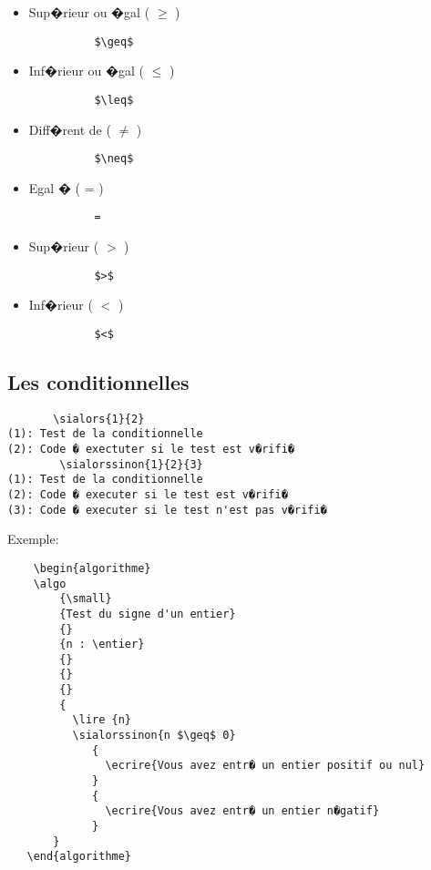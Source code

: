 \documentclass[a4paper,12pt]{report}
\begin{document}
\begin{itemize}
   \item Sup�rieur ou �gal ( $\geq$ )
       \begin{lstlisting}
          $\geq$
       \end{lstlisting}

   \item Inf�rieur ou �gal ( $\leq$ )

        \begin{lstlisting}
          $\leq$
        \end{lstlisting}

   \item Diff�rent de ( $\neq$ )

        \begin{lstlisting}
          $\neq$
        \end{lstlisting}

   \item Egal � ( = )
        \begin{lstlisting}
          =
        \end{lstlisting}
   \item Sup�rieur ( $>$ )
        \begin{lstlisting}
          $>$
        \end{lstlisting}
   \item Inf�rieur ( $<$ )

        \begin{lstlisting}
          $<$
        \end{lstlisting}
\end{itemize}

 \subsection {Les conditionnelles}
   \begin{lstlisting}
       \sialors{1}{2}
(1): Test de la conditionnelle
(2): Code � exectuter si le test est v�rifi�
        \sialorssinon{1}{2}{3}
(1): Test de la conditionnelle
(2): Code � executer si le test est v�rifi�
(3): Code � executer si le test n'est pas v�rifi�
   \end{lstlisting}

 Exemple:

 \begin{lstlisting}
    \begin{algorithme}
    \algo 
        {\small}
        {Test du signe d'un entier}
        {}
        {n : \entier}
        {}
        {}
        {}
        {
          \lire {n}
          \sialorssinon{n $\geq$ 0}
             {
               \ecrire{Vous avez entr� un entier positif ou nul}
             }
             {
               \ecrire{Vous avez entr� un entier n�gatif}
             }
       }
   \end{algorithme}
\end{lstlisting}
\end{document}

